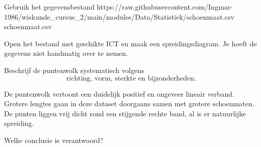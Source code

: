 \documentclass{ximera}
\begin{document}
\begin{oefening}{\oefU \ESS}

Gebruik het gegevensbestand \csv
{https://raw.githubusercontent.com/Ingmar-1986/wiskunde_cursus_2/main/modules/Data/Statistiek/schoenmaat.csv}
{schoenmaat.csv}

Open het bestand met geschikte ICT en maak een spreidingsdiagram.
Je hoeft de gegevens niet handmatig over te nemen.

\begin{question}
Beschrijf de puntenwolk systematisch volgens
\[
\text{richting, vorm, sterkte en bijzonderheden}.
\]

\begin{oplossing}
De puntenwolk vertoont een duidelijk positief en ongeveer lineair
verband. Grotere lengtes gaan in deze dataset doorgaans samen met
grotere schoenmaten. De punten liggen vrij dicht rond een stijgende
rechte band, al is er natuurlijke spreiding.
\end{oplossing}
\end{question}

\begin{question}
Welke conclusie is verantwoord?

\begin{multipleChoice}
\end{multipleChoice}
\end{question}

\end{oefening}
\end{document}

